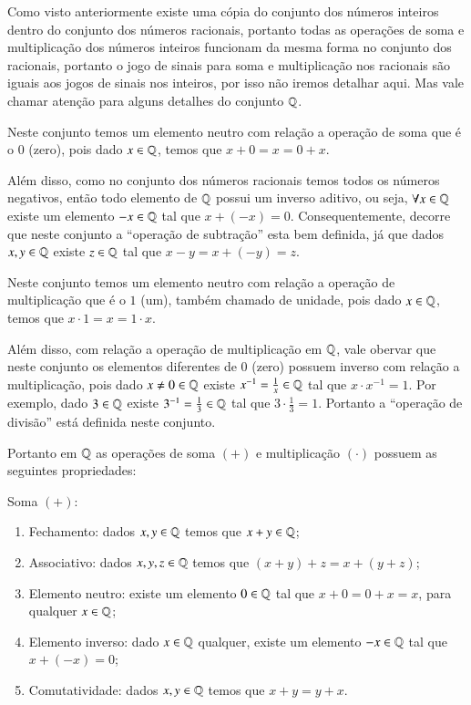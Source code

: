  Como visto anteriormente existe uma cópia do conjunto dos números inteiros dentro do conjunto dos números racionais, portanto todas as operações de soma e multiplicação dos números inteiros funcionam da mesma forma no conjunto dos racionais, portanto o jogo de sinais para soma e multiplicação nos racionais são iguais aos jogos de sinais nos inteiros, por isso não iremos detalhar aqui. Mas vale chamar atenção para alguns detalhes do conjunto $\mathbb{Q}$.

   Neste conjunto temos um elemento neutro com relação a operação de soma que é o $0$ (zero), pois dado $x \in \mathbb{Q}$, temos que $x+0= x= 0+x$.

 Além disso, como no conjunto dos números racionais temos todos os números negativos, então todo elemento de $\mathbb{Q}$ possui um inverso aditivo, ou seja, $\forall x \in \mathbb{Q}$ existe um elemento $-x \in \mathbb{Q}$ tal que $x + (-x)=0$. Consequentemente, decorre que neste conjunto a ``operação de subtração'' esta bem definida, já que dados $x, y \in \mathbb{Q}$ existe $z \in \mathbb{Q}$ tal que $x - y= x+ (-y)= z$.

 Neste conjunto temos um elemento neutro com relação a operação de multiplicação que é o $1$ (um), também chamado de unidade, pois dado $x \in \mathbb{Q}$, temos que $x \cdot 1= x= 1 \cdot x$.

 Além disso, com relação a operação de multiplicação em $\mathbb{Q}$, vale obervar que neste conjunto os elementos diferentes de $0$ (zero) possuem inverso com relação a multiplicação, pois dado $x \neq 0 \in \mathbb{Q}$ existe $x^{-1}= \frac{1}{x} \in \mathbb{Q}$ tal que $x \cdot x^{-1}= 1$. Por exemplo, dado $3 \in \mathbb{Q}$ existe $3^{-1}= \frac{1}{3} \in \mathbb{Q}$ tal que $3 \cdot \frac{1}{3}= 1$. Portanto a ``operação de divisão'' está definida neste conjunto.

   \vskip0.3cm

 Portanto em $\mathbb{Q}$ as operações de soma $(+)$ e multiplicação $(\cdot)$ possuem as seguintes propriedades:

 Soma $(+)$:
 \begin{enumerate}[1)]
 \item Fechamento: dados $x, y \in \mathbb{Q}$ temos que $x+y \in \mathbb{Q}$;
 \item Associativo: dados $x, y, z \in \mathbb{Q}$ temos que $(x+y)+z= x+(y+z)$;
 \item Elemento neutro: existe um elemento $0 \in \mathbb{Q}$ tal que $x+0=0+x=x$, para qualquer $x \in \mathbb{Q}$;
 \item Elemento inverso: dado $x \in \mathbb{Q}$ qualquer, existe um elemento $-x \in \mathbb{Q}$ tal que $x+(-x)=0$;
 \item Comutatividade: dados $x, y \in \mathbb{Q}$ temos que $x+y= y+x$.
 \end{enumerate}

